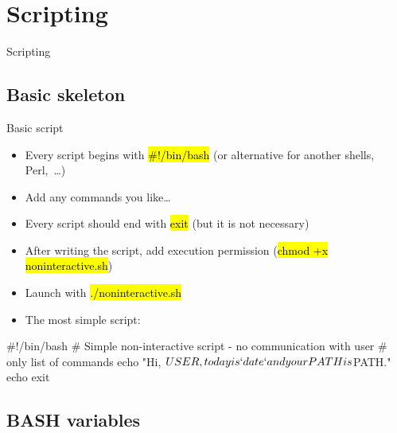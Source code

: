 \documentclass[compress, ucs, xelatex, 11pt, xcolor=svgnames,
  hyperref={
    bookmarks=true,
    unicode=true,
    colorlinks=true,
    pdftitle={Linux, command line and MetaCentrum},
    plainpages=false,
    pdfauthor={Vojtech Zeisek},
    pdfsubject={Course about use of Linux command line, writing shell scripts and using MetaCentrum of CESNET},
    pdfcreator={XeLaTeX},
    pdfkeywords={Linux, GNU, BASH, shell, command line, MetaCentrum},
    linkcolor=DarkRed,
    anchorcolor=DarkBlue,
    citecolor=Indigo,
    filecolor=NavyBlue,
    menucolor=DarkMagenta,
    urlcolor=DarkBlue,
    pdftex},
  url={hyphens, lowtilde} %
  ]{beamer}
\renewcommand{\texttt}[1]{\hl{\ttfamily #1}}
\begin{document}
\section{Scripting} %

\begin{frame}{Scripting}
  \tableofcontents[currentsection, sectionstyle=show/hide, hideothersubsections]
\end{frame}

\subsection{Basic skeleton}

\begin{frame}[fragile]{Basic script}
  \begin{itemize}
    \item Every script begins with \texttt{\#!/bin/bash} (or alternative for another shells, Perl,~\ldots)
    \item Add any commands you like\ldots
    \item Every script should end with \texttt{exit} (but it is not necessary)
    \item After writing the script, add execution permission (\texttt{chmod +x noninteractive.sh})
    \item Launch with \texttt{./noninteractive.sh}
    \item The most simple script:
  \end{itemize}
  \begin{bashcode}
    #!/bin/bash
    # Simple non-interactive script - no communication with user
    # only list of commands
    echo "Hi, $USER, today is `date` and your PATH is $PATH."
    echo
    exit
  \end{bashcode}
\end{frame}

\subsection{BASH variables}
\end{document}

